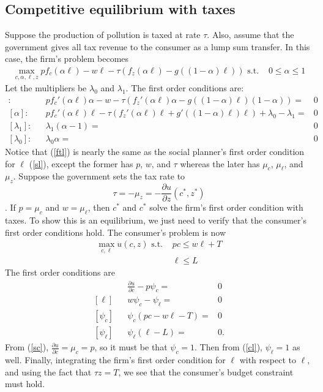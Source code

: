 \documentclass[12pt,reqno]{amsart}
\theoremstyle{definition}
\begin{document}
\subsection{Competitive equilibrium with taxes}

Suppose the production of pollution is taxed at rate $\tau$. Also,
assume that the government gives all tax revenue to the consumer as a
lump sum transfer. 
In this case, the firm's problem becomes
\begin{align*}
  \max_{c,\alpha,\ell,z} p f_c(\alpha \ell) - w \ell -
  \tau\left(f_z(\alpha \ell) - g((1-\alpha)\ell) \right) \text{ s.t. } & 0
  \leq \alpha \leq 1 
\end{align*}
Let the multipliers be $\lambda_0$ and $\lambda_1$. The first order
conditions are:  
\begin{align*} 
  [\ell]: & & p f_c'(\alpha \ell) \alpha - w - \tau \left( f_z'(\alpha
    \ell)\alpha - g((1-\alpha)\ell)(1-\alpha) \right) = &
  0  \\
  [\alpha]: & & p f_c'(\alpha \ell) \ell - \tau \left( f_z'(\alpha\ell)
    \ell + g'((1-\alpha)\ell) \ell \right) + \lambda_{0} - \lambda_{1} =
  & 0  \\ 
  [\lambda_{1}]: && \lambda_{1}(\alpha -1) = & 0 \\
  [\lambda_{0}]: && \lambda_{0}\alpha = & 0 
\end{align*}
Notice that (\ref{ftl}) is nearly the same as the social planner's
first order condition for $\ell$ (\ref{sl}), except the former has
$p$, $w$, and $\tau$ whereas the later has $\mu_c$, $\mu_\ell$, and
$\mu_z$. Suppose the government sets the tax rate to 
\[ \tau = -\mu_z = -
\frac{\partial u}{\partial z}(c^*,z^*) \].
If $p = \mu_c$ and $w=\mu_\ell$, then $c^*$ and $c^*$ solve the firm's
first order condition with taxes. To show this is an equilibrium, we
just need to verify that the consumer's first order conditions hold.
The consumer's problem is now 
\begin{align*}
  \max_{c,\ell} u(c,z) \text{ s.t. } & pc \leq w \ell + T \\
  & \ell \leq L 
\end{align*}
The first order conditions are
\begin{align}
  [c]&& \frac{\partial u}{\partial c} - p \psi_c = & 0 \label{cc} \\
  [\ell]&&  w \psi_c - \psi_\ell = & 0 \label{cl} \\
  [\psi_c]&& \psi_c(pc-w\ell - T) = & 0 \\
  [\psi_\ell] && \psi_\ell(\ell-L) = & 0.
\end{align}
From (\ref{sc}), $\frac{\partial u}{\partial c} = \mu_c = p $, so it
must be that $\psi_c = 1$.  Then from (\ref{cl}), $\psi_\ell = 1$ as
well. Finally, integrating the firm's first order condition for $\ell$
with respect to $\ell$, and using the fact that $\tau z = T$, we see
that the consumer's budget constraint must hold. 
\end{document}
